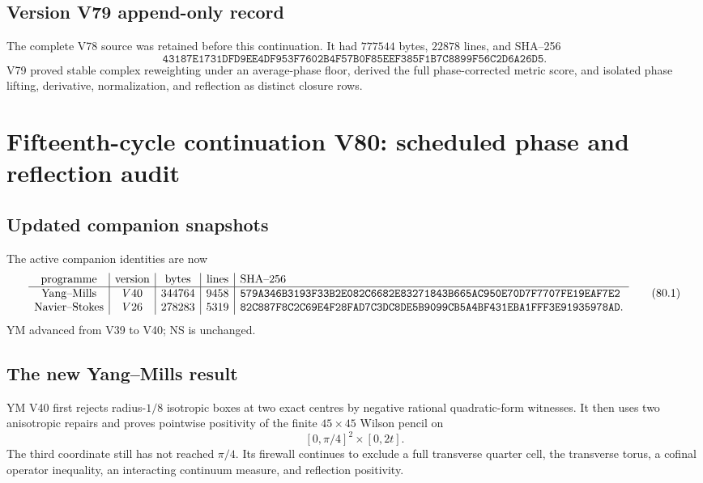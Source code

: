\documentclass[11pt]{article}
\theoremstyle{remark}
\begin{document}
\section*{Version V79 append-only record}
The complete V78 source was retained before this continuation.  It
had \(777544\) bytes, \(22878\) lines, and SHA--256
\[
 \texttt{43187E1731DFD9EE4DF953F7602B4F57B0F85EEF385F1B7C8899F56C2D6A26D5}.
\]
V79 proved stable complex reweighting under an average-phase floor,
derived the full phase-corrected metric score, and isolated phase
lifting, derivative, normalization, and reflection as distinct
closure rows.


\chapter{Fifteenth-cycle continuation V80: scheduled phase and reflection audit}
\label{sec:v15v80}

\section{Updated companion snapshots}

The active companion identities are now
\[
\begin{array}{c|c|c|c|l}
\hbox{programme}&\hbox{version}&\hbox{bytes}&\hbox{lines}&\hbox{SHA--256}\\ \hline
\hbox{Yang--Mills}&V40&344764&9458&
\texttt{579A346B3193F33B2E082C6682E83271843B665AC950E70D7F7707FE19EAF7E2}\\
\hbox{Navier--Stokes}&V26&278283&5319&
\texttt{82C887F8C2C69E4F28FAD7C3DC8DE5B9099CB5A4BF431EBA1FFF3E91935978AD}.
\end{array}                                             \tag{80.1}
\]
YM advanced from V39 to V40; NS is unchanged.

\section{The new Yang--Mills result}

YM V40 first rejects radius-\(1/8\) isotropic boxes at two exact
centres by negative rational quadratic-form witnesses.  It then
uses two anisotropic repairs and proves pointwise positivity of the
finite \(45\times45\) Wilson pencil on
\[
 [0,\pi/4]^2\times[0,2t].                             \tag{80.2}
\]
The third coordinate still has not reached \(\pi/4\).  Its firewall
continues to exclude a full transverse quarter cell, the transverse
torus, a cofinal operator inequality, an interacting continuum
measure, and reflection positivity.
\end{document}
